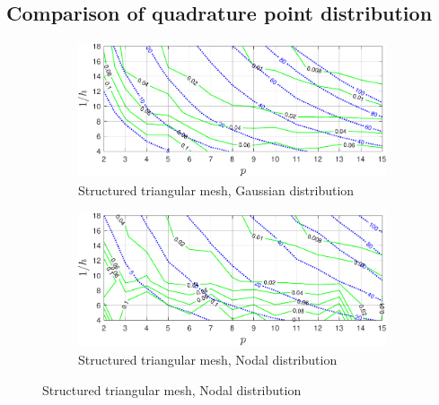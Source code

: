 \subsection{Comparison of quadrature point distribution}
\begin{figure}[h!]
    \centering

    \begin{subfigure}{0.45\textwidth}
        \centering
        \includegraphics[width=\linewidth, height=4cm]{figs/distri_str_origin_std.pdf}  
        \caption{Structured triangular mesh, Gaussian distribution}
        \label{distri_str_origin_std}
    \end{subfigure}
    \begin{subfigure}{0.45\textwidth}
        \centering
        \includegraphics[width=\linewidth, height=4cm]{figs/distri_str_nodal_std.pdf}  
        \caption{Structured triangular mesh, Nodal distribution}
        \label{distri_str_nodal_std}
    \end{subfigure}


\end{figure}
